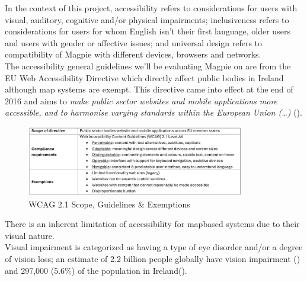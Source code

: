 In the context of this project, accessibility refers to considerations for users with visual, auditory, cognitive and/or physical impairments; inclusiveness refers to considerations for users for whom English isn't their first language, older users and users with gender or affective issues; and universal design refers to compatibility of Magpie with different devices, browsers and networks.\\

\noindent The accessibility general guidelines we'll be evaluating Magpie on are from the EU Web Accessibility Directive which directly affect public bodies in Ireland although map systems are exempt. This directive came into effect at the end of 2016 and aims to \emph{make public sector websites and mobile applications more accessible, and to harmonise varying standards within the European Union (\ldots)} (\cite{webaccessibilitydirective2016}).\\
\begin{figure}[h!]
    \centering
    \includegraphics[width=0.85\textwidth]{images/wcag-guidelines.png}
    \caption{WCAG 2.1 Scope, Guidelines \& Exemptions}
\end{figure}

\noindent There is an inherent limitation of accessibility for map\-based systems due to their visual nature.\\
Visual impairment is categorized as having a type of eye disorder and/or a degree of vision loss; an estimate of 2.2 billion people globally have vision impairment (\cite{whoworldreportvision2019}) and 297,000 (5.6\%) of the population in Ireland(\cite{visionirelandcensus}).\\


